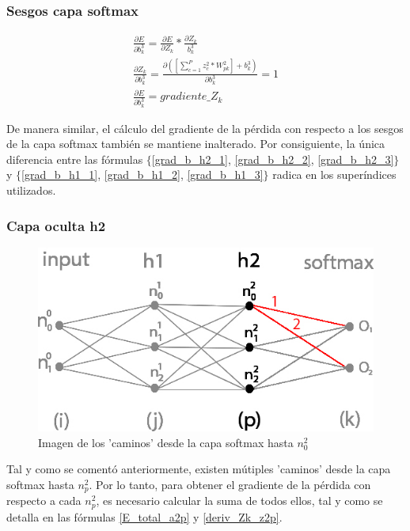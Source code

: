 \subsubsection{Sesgos capa softmax}

\begin{gather}
	\frac{\partial E}{\partial b^3_k} = \frac{\partial E}{\partial Z_k} * \frac{\partial Z_k}{b^3_k} \label{grad_b_h2_1} \\
	\frac{\partial Z_k }{\partial b^3_k } = \frac{\partial ([\sum_{c=1}^{P} z^2_c * W^2_{pk}] + b^3_k) }{\partial b^3_k } = 1 \label{grad_b_h2_2} \\
	\frac{\partial E}{\partial b^3_k} = gradiente\_Z_k \label{grad_b_h2_3}
\end{gather}

De manera similar, el cálculo del gradiente de la pérdida con respecto a los sesgos de la capa softmax también se mantiene inalterado. Por consiguiente, la única diferencia entre las fórmulas $\{$\ref{grad_b_h2_1}, \ref{grad_b_h2_2}, \ref{grad_b_h2_3}$\}$ y $\{$\ref{grad_b_h1_1}, \ref{grad_b_h1_2}, \ref{grad_b_h1_3}$\}$ radica en los superíndices utilizados.

\subsubsection{Capa oculta h2}

\begin{figure}[H]
	\centering
	\includegraphics[scale=0.35]{imagenes/nn_h2_caminos_posibles.jpg}  
	\caption{Imagen de los 'caminos' desde la capa softmax hasta $n^2_0$}
	\label{nn_h2_caminos_posibles}
\end{figure}

Tal y como se comentó anteriormente, existen mútiples 'caminos' desde la capa softmax hasta $n^2_p$. Por lo tanto, para obtener el gradiente de la pérdida con respecto a cada $n^2_p$, es necesario calcular la suma de todos ellos, tal y como se detalla en las fórmulas \ref{E_total_a2p} y \ref{deriv_Zk_z2p}. \\

